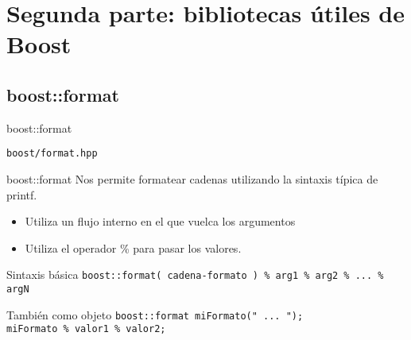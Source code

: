 \documentclass[8pt,xcolor=svgnames]{beamer}
\begin{document}
\section{Segunda parte: bibliotecas útiles de Boost}
\subsection{boost::format}

\begin{frame}{boost::format}
  \begin{block}{}
    \texttt{boost/format.hpp}
  \end{block}
  \begin{block}{boost::format}
    Nos permite formatear cadenas utilizando la sintaxis típica de printf.

    \begin{itemize}
    \item Utiliza un flujo interno en el que vuelca los argumentos
    \item Utiliza el operador \% para pasar los valores.
    \end{itemize}
  \end{block}

  \begin{block}{Sintaxis básica}
    \texttt{boost::format( cadena-formato ) \% arg1 \% arg2 \% ... \% argN}    
  \end{block}

  \begin{block}{También como objeto}
    \texttt{boost::format miFormato(" ... ");} \\
    \texttt{miFormato \% valor1 \% valor2; }
  \end{block}
\end{frame}
\end{document}
